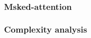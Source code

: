 \documentclass[11pt]{article}
\begin{document}
\subsubsection{Msked-attention}

\begin{figure}[H]
    \centering
\end{figure}

\subsubsection{Complexity analysis}

\begin{figure}[H]
    \centering
\end{figure}
\end{document}
